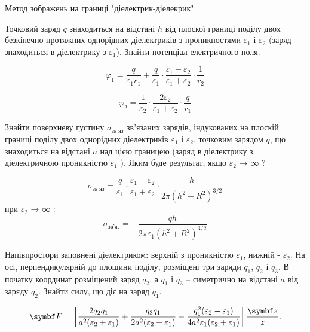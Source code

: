 \documentclass[]{ProblemBook}
\begin{document}
Метод зображень на границі "діелектрик-діелекрик"

\begin{problem}
    Точковий заряд $q$ знаходиться на відстані $h$ від плоскої границі поділу двох безкінечно протяжних однорідних діелектриків з проникностями $\varepsilon_{1}$ і $\varepsilon_{2}$ (заряд знаходиться в діелектрику з $\varepsilon_{1}$). Знайти потенціал електричного поля.
	\begin{solution}

\[\varphi_{1}=\frac{q}{\varepsilon_{1}r_{1}}+\frac{q}{\varepsilon_{1}}\cdot\frac{\varepsilon_{1}-\varepsilon_{2}}{\varepsilon_{1}+\varepsilon_{2}}\cdot\frac{1}{r_{2}}\]

\[\varphi_{2}=\frac{1}{\varepsilon_{2}}\cdot\frac{2\varepsilon_{2}}{\varepsilon_{1}+\varepsilon_{2}}\cdot\frac{q}{r_{1}}\]
\end{solution}
\end{problem}

\begin{problem}
   Знайти поверхневу густину $\sigma_{\text{зв’яз}}$ зв’язаних зарядів, індукованих на плоскій границі поділу двох однорідних діелектриків $\varepsilon_{1}$ і $\varepsilon_{2}$, точковим зарядом $q$, що знаходиться на відстані $a$ над цією границею (заряд в діелектрику з діелектричною проникністю $\varepsilon_{1}$ ).  Яким буде результат, якщо $\varepsilon_{2}$ → ∞ ?
	\begin{solution}
	\[\sigma_{\text{зв'яз}}=\frac{q}{\varepsilon_{1}}\cdot\frac{\varepsilon_{1}-\varepsilon_{2}}{\varepsilon_{1}+\varepsilon_{2}}\cdot\frac{h}{2\pi(h^2+R^2)^{3/2}}\]
при $\varepsilon_{2}$ → ∞ :
\[\sigma_{\text{зв'яз}}=-\frac{qh}{2\pi\varepsilon_{1}(h^2+R^2)^{3/2}}\]
\end{solution}
\end{problem}

\begin{problem}
  Напівпростори заповнені діелектриком: верхній з проникністю $\varepsilon_{1}$, нижній - $\varepsilon_{2}$. На осі, перпендикулярній до площини поділу, розміщені три заряди $q_{1}$, $q_{2}$ і $q_{3}$. В початку координат розміщений заряд $q_{2}$, а $q_{1}$ і $q_{3}$ – симетрично на відстані $a$ від заряду $q_{2}$. Знайти силу, що діє на заряд $q_{1}$.   
	\begin{solution}
	\[\vect{F}=\left[\frac{2q_{2}q_{1}}{a^2(\varepsilon_{2}+\varepsilon_{1})}+\frac{q_{3}q_{1}}{2a^2(\varepsilon_{2}+\varepsilon_{1})}-\frac{q_{1}^2(\varepsilon_{2}-\varepsilon_{1})}{4a^2\varepsilon_{1}(\varepsilon_{2}+\varepsilon_{1})}\right]\frac{\vect{z}}{z}.\]
\end{solution}
\end{problem}
\end{document}
